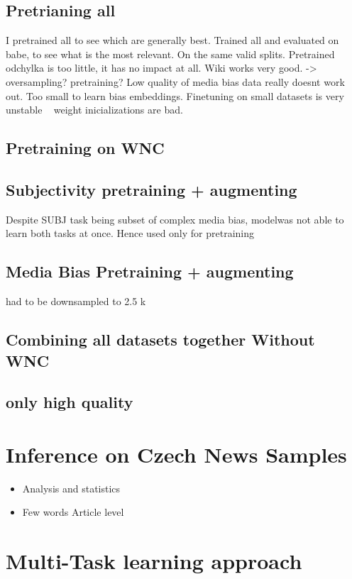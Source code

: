  \subsection{Pretrianing all}
 I pretrained all to see which are generally best. Trained all and evaluated on babe, to see what is the most relevant. On the same valid splits.
 Pretrained odchylka is too little, it has no impact at all. Wiki works very good. -> oversampling? pretraining? Low quality of media bias data really doesnt work out. Too small to learn bias embeddings.
 Finetuning on small datasets is very unstable ~ weight inicializations are bad.
 \subsection{Pretraining on WNC}
 \subsection{Subjectivity pretraining + augmenting}
 Despite SUBJ task being subset of complex media bias, modelwas not able to learn both tasks at once. Hence used only for pretraining
 \subsection{Media Bias Pretraining + augmenting }
 had to be downsampled to 2.5 k
 \subsection{Combining all datasets together Without WNC}
 \subsection{only high quality}

 
 
 
 
\section{Inference on Czech News Samples}
\begin{itemize}
    \item Analysis and statistics
    \item Few words Article level
\end{itemize}


\section{Multi-Task learning approach}\label{mtl}